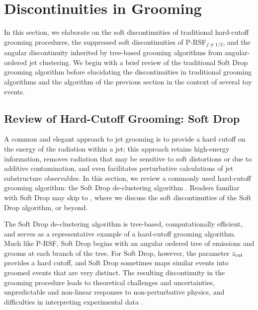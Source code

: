 \section{Discontinuities in Grooming}
\label{sec:traditionaldiscont}
In this section, we elaborate on the soft discontinuities of traditional hard-cutoff grooming procedures, the suppressed soft discontinuities of P-RSF\(_{f\neq 1/2}\), and the angular discontinuity inherited by tree-based grooming algorithms from angular-ordered jet clustering.
%
We begin with a brief review of the traditional Soft Drop grooming algorithm before elucidating the discontinuities in traditional grooming algorithms and the  algorithm of the previous section in the context of several toy events.

\subsection{Review of Hard-Cutoff Grooming: Soft Drop}
\label{sec:softdrop}
A common and elegant approach to jet grooming is to provide a hard cutoff on the energy of the radiation within a jet;
%
this approach retains high-energy information, removes radiation that may be sensitive to soft distortions or due to additive contamination, and even facilitates perturbative calculations of jet substructure observables.
%
In this section, we review a commonly used hard-cutoff grooming algorithm:
%
the Soft Drop de-clustering algorithm \cite{Larkoski:2014wba}.
%
Readers familiar with Soft Drop may skip to , where we discuss the soft discontinuities of the Soft Drop algorithm, or beyond.

The Soft Drop de-clustering algorithm is tree-based, computationally efficient, and serves as a representative example of a hard-cutoff grooming algorithm.
%
Much like P-RSF, Soft Drop begins with an angular ordered tree of emissions and grooms at each branch of the tree.
%
For Soft Drop, however, the parameter \(z_{\rm cut}\) provides a hard cutoff, and Soft Drop sometimes maps similar events into groomed events that are very distinct.
%
The resulting discontinuity in the grooming procedure leads to theoretical challenges and uncertainties, unpredictable and non-linear responses to non-perturbative physics, and difficulties in interpreting experimental data \cite{ATL-PHYS-PUB-2019-027,Aad:2019vyi,ATLAS:2020gwe}.

